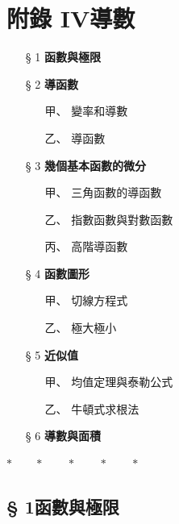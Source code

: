 \section*{附錄 IV\quad 導數}\label{sec:b6-app4}
\resetsectcounters

\begin{itemize}[leftmargin=3em, itemsep=0.2em]
  \item[§ 1] \textbf{函數與極限}
  \item[§ 2] \textbf{導函數}
  \begin{itemize}[leftmargin=2em, itemsep=0.1em]
    \item[甲、] 變率和導數
    \item[乙、] 導函數
  \end{itemize}
  \item[§ 3] \textbf{幾個基本函數的微分}
  \begin{itemize}[leftmargin=2em, itemsep=0.1em]
    \item[甲、] 三角函數的導函數
    \item[乙、] 指數函數與對數函數
    \item[丙、] 高階導函數
  \end{itemize}
  \item[§ 4] \textbf{函數圖形}
  \begin{itemize}[leftmargin=2em, itemsep=0.1em]
    \item[甲、] 切線方程式
    \item[乙、] 極大極小
  \end{itemize}
  \item[§ 5] \textbf{近似值}
  \begin{itemize}[leftmargin=2em, itemsep=0.1em]
    \item[甲、] 均值定理與泰勒公式
    \item[乙、] 牛頓式求根法
  \end{itemize}
  \item[§ 6] \textbf{導數與面積}
\end{itemize}

\begin{center}
$* \qquad * \qquad * \qquad * \qquad *$
\end{center}

\subsection*{§ 1\quad 函數與極限}\label{subsec:b6-app4-1}


